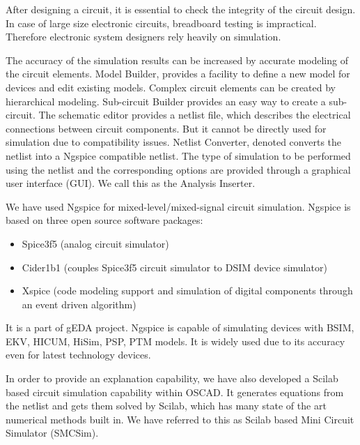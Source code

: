 After designing a circuit, it is essential to check the integrity of the circuit design. In case of large size electronic circuits, breadboard testing is impractical. Therefore electronic system designers rely heavily on simulation.


The accuracy of the simulation results can be increased by accurate modeling of the circuit elements. Model Builder, provides a facility to define a new model for devices and edit existing models. Complex circuit elements can be created by hierarchical modeling. Sub-circuit Builder provides an easy way to create a sub-circuit. The schematic editor provides a netlist file, which describes the electrical connections between circuit components. But it cannot be directly used for simulation due to compatibility issues. Netlist Converter, denoted converts the netlist into a Ngspice compatible netlist. The type of simulation to be performed using the netlist and the corresponding options are provided through a graphical user interface (GUI). We call this as the Analysis Inserter.


We have used Ngspice for mixed-level/mixed-signal circuit simulation. Ngspice is based on three open source software packages\cite{spice}: 
\begin{itemize}
\item Spice3f5 (analog circuit simulator) 
\item Cider1b1 (couples Spice3f5 circuit simulator to DSIM device simulator)
\item Xspice (code modeling support and simulation of digital components through an event driven algorithm)
\end{itemize}
 
It is a part of gEDA project. Ngspice is capable of simulating devices with BSIM, EKV, HICUM, HiSim, PSP, PTM models. It is widely used due to its accuracy even for latest technology devices.

In order to provide an explanation capability, we have also developed a Scilab based circuit simulation capability within OSCAD. It generates equations from the netlist and gets them solved by Scilab, which has many state of the art numerical methods built in. We have referred to this as Scilab based Mini Circuit Simulator (SMCSim).








